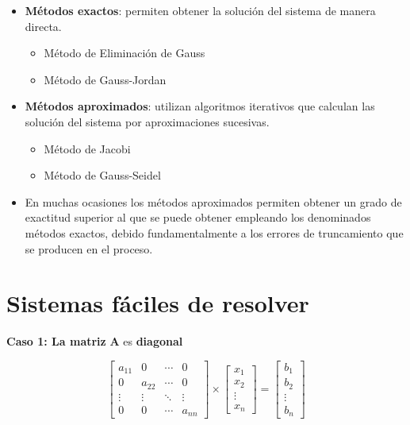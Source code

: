 \documentclass[]{book}
\providecommand{\tightlist}{%
  \setlength{\itemsep}{0pt}\setlength{\parskip}{0pt}}
\begin{document}
\begin{itemize}
\item
  \textbf{Métodos exactos}: permiten obtener la solución del sistema de manera directa.

  \begin{itemize}
  \tightlist
  \item
    Método de Eliminación de Gauss
  \item
    Método de Gauss-Jordan
  \end{itemize}
\item
  \textbf{Métodos aproximados}: utilizan algoritmos iterativos que calculan las solución del sistema por aproximaciones sucesivas.

  \begin{itemize}
  \tightlist
  \item
    Método de Jacobi
  \item
    Método de Gauss-Seidel
  \end{itemize}
\item
  En muchas ocasiones los métodos aproximados permiten obtener un grado de exactitud superior al que se puede obtener empleando los denominados métodos exactos, debido fundamentalmente a los errores de truncamiento que se producen en el proceso.
\end{itemize}

\hypertarget{sistemas-fuxe1ciles-de-resolver}{%
\section{Sistemas fáciles de resolver}\label{sistemas-fuxe1ciles-de-resolver}}

\textbf{Caso 1: La matriz} \(\mathbf{A}\) es \textbf{diagonal}

\[
\begin{bmatrix}
a_{11} & 0 & \cdots & 0 \\
0 & a_{22} & \cdots & 0 \\
\vdots & \vdots & \ddots & \vdots \\
0 & 0 & \cdots & a_{nn} 
\end{bmatrix}
\times 
\begin{bmatrix}
x_1 \\ x_2 \\ \vdots \\ x_n
\end{bmatrix}
=
\begin{bmatrix}
b_1 \\ b_2 \\ \vdots \\ b_n
\end{bmatrix}
\]
\end{document}

